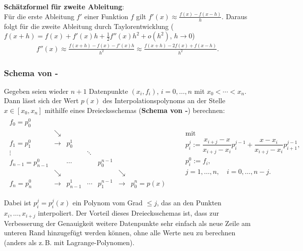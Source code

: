 \linie

\textbf{Schätzformel für zweite Ableitung}: \\
Für die erste Ableitung $f'$ einer Funktion $f$ gilt
$f'(x) \approx \frac{f(x) - f(x - h)}{h}$.
Daraus folgt für die zweite Ableitung durch Taylorentwicklung
($f(x + h) = f(x) + f'(x)h + \frac{1}{2} f''(x) h^2 + o(h^2)$, $h \to 0$)
\begin{align*}
    f''(x) \approx \frac{f(x + h) - f(x) - f'(x)h}{h^2}
    \approx \frac{f(x + h) - 2f(x) + f(x - h)}{h^2}.
\end{align*}

\subsubsection{%
    Schema von -%
}

Gegeben seien wieder $n + 1$ Datenpunkte $(x_i, f_i)$, $i = 0, \dotsc, n$
mit $x_0 < \dotsb < x_n$. \\
Dann lässt sich der Wert $p(x)$ des Interpolationspolynoms an der Stelle
$x \in [x_0, x_n]$ mithilfe eines Dreiecksschemas
(\textbf{Schema von -}) berechnen:
\begin{align*}
    \begin{array}{ccccccc}
        f_0 = p_0^0 \\
        & \searrow \\
        f_1 = p_1^0 & \rightarrow & p_0^1 \\
        \vdots & & & \ddots \\
        f_{n-1} = p_{n-1}^0 & & \cdots & & p_0^{n-1} \\
        & \searrow & & & & \searrow \\
        f_n = p_n^0 & \rightarrow & p_{n-1}^1 & \cdots & p_1^{n-1} &
        \rightarrow & p_0^n = p(x)
    \end{array}\qquad
    \begin{array}{l}
        \text{mit} \\
        p_i^j := \dfrac{x_{i+j} - x}{x_{i+j} - x_i} p_i^{j-1} +
        \dfrac{x - x_i}{x_{i+j} - x_i} p_{i+1}^{j-1}, \\
        p_i^0 := f_i, \\[3mm]
        j = 1, \dotsc, n,\quad i = 0, \dotsc, n - j.
    \end{array}
\end{align*}

Dabei ist $p_i^j = p_i^j(x)$ ein Polynom vom Grad $\le j$, das an den Punkten
$x_i, \dotsc, x_{i+j}$ interpoliert.
Der Vorteil dieses Dreiecksschemas ist, dass zur Verbesserung der Genauigkeit
weitere Datenpunkte sehr einfach als neue Zeile am unteren Rand hinzugefügt
werden können, ohne alle Werte neu zu berechnen
(anders als z.\,B. mit Lagrange-Polynomen).

